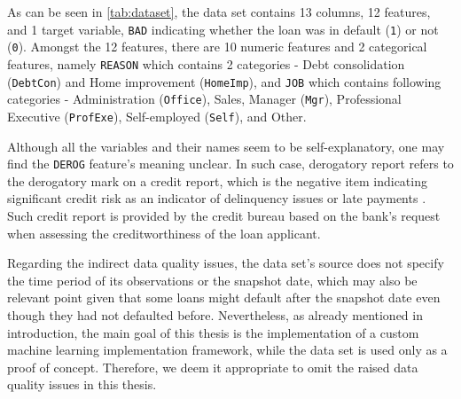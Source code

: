 As can be seen in \autoref{tab:dataset}, the data set contains 13 columns, 12 features, and 1 target variable, \texttt{BAD} indicating whether the loan was in default (\texttt{1}) or not (\texttt{0}).
Amongst the 12 features, there are 10 numeric features and 2 categorical features, namely \texttt{REASON} which contains 2 categories - Debt consolidation (\texttt{DebtCon}) and Home improvement (\texttt{HomeImp}), and \texttt{JOB} which contains following categories - Administration (\texttt{Office}), Sales, Manager (\texttt{Mgr}), Professional Executive (\texttt{ProfExe}), Self-employed (\texttt{Self}), and Other.

Although all the variables and their names seem to be self-explanatory, one may find the \texttt{DEROG} feature's meaning unclear. In such case, derogatory report refers to the derogatory mark on a credit report, which is the negative item indicating significant credit risk as an indicator of delinquency issues or late payments \citep{experian}. Such credit report is provided by the credit bureau based on the bank's request when assessing the creditworthiness of the loan applicant.


Regarding the indirect data quality issues, the data set's source does not specify the time period of its observations or the snapshot date, which may also be relevant point given that some loans might default after the snapshot date even though they had not defaulted before.
Nevertheless, as already mentioned in introduction, the main goal of this thesis is the implementation of a custom machine learning implementation framework, while the data set is used only as a proof of concept.
Therefore, we deem it appropriate to omit the raised data quality issues in this thesis.

